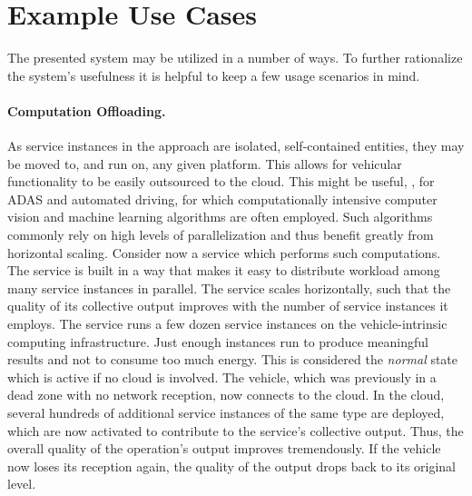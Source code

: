 \section{Example Use Cases} \label{sec:usecases}
The presented system may be utilized in a number of ways. To further rationalize the system's usefulness it is helpful to keep a few usage scenarios in mind.

\paragraph{Computation Offloading.}
As service instances in the approach are isolated, self-contained entities, they may be moved to, and run on, any given platform. This allows for vehicular functionality to be easily outsourced to the cloud. This might be useful, \eg , for ADAS and automated driving, for which computationally intensive computer vision and machine learning algorithms are often employed. Such algorithms commonly rely on high levels of parallelization and thus benefit greatly from horizontal scaling. Consider now a service which performs such computations. The service is built in a way that makes it easy to distribute workload among many service instances in parallel. The service scales horizontally, such that the quality of its collective output improves with the number of service instances it employs. The service runs a few dozen service instances on the vehicle-intrinsic computing infrastructure. Just enough instances run to produce meaningful results and not to consume too much energy. This is considered the \emph{normal} state which is active if no cloud is involved. The vehicle, which was previously in a dead zone with no network reception, now connects to the cloud. In the cloud, several hundreds of additional service instances of the same type are deployed, which are now activated to contribute to the service's collective output. Thus, the overall quality of the operation's output improves tremendously. If the vehicle now loses its reception again, the quality of the output drops back to its original level.

